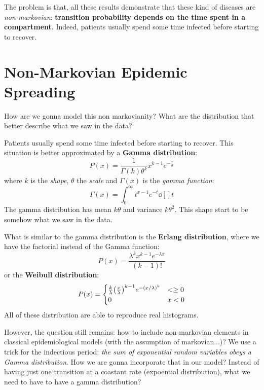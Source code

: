 \documentclass[../main/main.tex]{subfiles}
\begin{document}
The problem is that, all these results demonstrate that these kind of diseases are \emph{non-markovian}: \textbf{transition probability depends on the time spent in a compartment}. Indeed, patients usually spend some time infected before starting to recover.




\section{Non-Markovian Epidemic Spreading}

How are we gonna model this non markovianity?
What are the distribution that better describe what we saw in the data?

Patients usually spend some time infected before starting to recover. This situation is better approximated by a \textbf{Gamma distribution}:
\begin{equation}
  P(x) = \frac{1}{\Gamma (k) \theta ^k} x^{k-1} e^{- \frac{x}{\theta }}
\end{equation}
where \( k \) is the \emph{shape}, \( \theta  \) the \emph{scale} and   \( \Gamma (x) \) is the \emph{gamma function}:
\begin{equation*}
  \Gamma (x) = \int_{0}^{\infty } t^{x-1} e^{-t} \dd[]{t}
\end{equation*}
The gamma distribution has mean \( k \theta  \) and variance \( k \theta ^2 \).
This shape start to be somehow what we saw in the data.

What is similar to the gamma distribution is the \textbf{Erlang distribution}, where we have the factorial instead of the Gamma function:
\begin{equation}
  P (x) = \frac{\lambda ^k x^{k-1}e^{- \lambda x} }{(k-1)!}
\end{equation}
or the \textbf{Weibull distribution}:
  \begin{equation}
  P(x) =
    \begin{cases}
     \frac{k}{\lambda } \qty(\frac{x}{\lambda })^{k-1} e^{- (x/\lambda )^k} & < \ge 0  \\
    0 & x <0
    \end{cases}
  \end{equation}
All of these distribution are able to reproduce real histograms.

However, the question still remains: how to include non-markovian elements in classical epidemiological models (with the assumption of markovian...)?
We use a trick for the indectious period: \emph{the sum of exponential random variables obeys a Gamma distribution}.
How we are gonna incorporate that in our model? Instead of having just one transition at a coastant rate (expoential distribution), what we need to have to have a gamma distribution?
\end{document}
